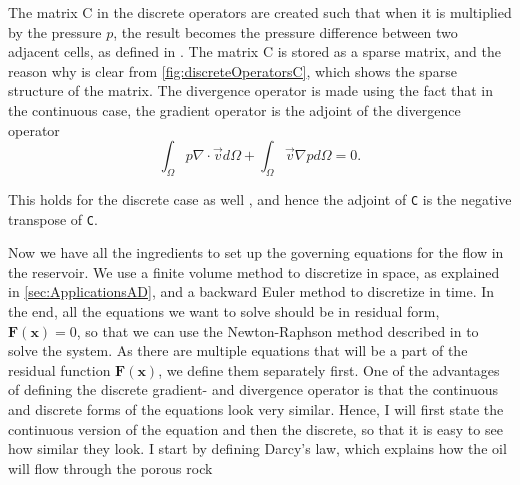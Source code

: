 The matrix C in the discrete operators are created such that when it is multiplied by the pressure $p$, the result becomes the pressure difference between two adjacent cells, as defined in . The matrix C is stored as a sparse matrix, and the reason why is clear from \autoref{fig:discreteOperatorsC}, which shows the sparse  structure of the matrix. The divergence operator is made using the fact that in the continuous case, the gradient operator is the adjoint of the divergence operator
\begin{equation*}
    \int_\Omega p\nabla \cdot \vec{v} d\Omega + \int_\Omega \vec{v}\nabla p d\Omega = 0.
\end{equation*}

This holds for the discrete case as well \emph{\citep{lieMrstUrl}}, and hence the adjoint of \texttt{C} is the negative transpose of \texttt{C}.


Now we have all the ingredients to set up the governing equations for the flow in the reservoir. We use a finite volume method to discretize in space, as explained in \autoref{sec:ApplicationsAD}, and a backward Euler method to discretize in time. In the end, all the equations we want to solve should be in residual form, $\boldsymbol{F}(\boldsymbol{x}) = 0$, so that we can use the Newton-Raphson method described in  to solve the system. As there are multiple equations that will be a part of the residual function $\boldsymbol{F}(\boldsymbol{x})$, we define them separately first. One of the advantages of defining the discrete gradient- and divergence operator is that the continuous and discrete forms of the equations look very similar. Hence, I will first state the continuous version of the equation and then the discrete, so that it is easy to see how similar they look. I start by defining Darcy's law, which explains how the oil will flow through the porous rock

